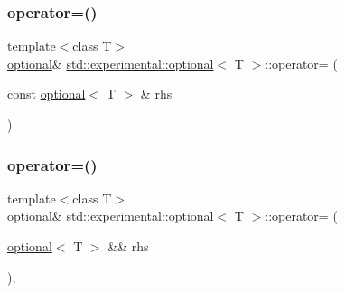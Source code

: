 \mbox{\label{classstd_1_1experimental_1_1optional_a79fc2baa94eb20e81898e351edbe984f}} 
\subsubsection{\texorpdfstring{operator=()}{operator=()}\hspace{0.1cm}{\footnotesize\ttfamily [2/4]}}
{\footnotesize\ttfamily template$<$class T$>$ \\
\hyperlink{classstd_1_1experimental_1_1optional}{optional}\& \hyperlink{classstd_1_1experimental_1_1optional}{std\+::experimental\+::optional}$<$ T $>$\+::operator= (\begin{DoxyParamCaption}\item[{const \hyperlink{classstd_1_1experimental_1_1optional}{optional}$<$ T $>$ \&}]{rhs }\end{DoxyParamCaption})\hspace{0.3cm}{\ttfamily [inline]}}

\mbox{\label{classstd_1_1experimental_1_1optional_a458e0eb811fd30159370230cb977ab7a}} 
\subsubsection{\texorpdfstring{operator=()}{operator=()}\hspace{0.1cm}{\footnotesize\ttfamily [3/4]}}
{\footnotesize\ttfamily template$<$class T$>$ \\
\hyperlink{classstd_1_1experimental_1_1optional}{optional}\& \hyperlink{classstd_1_1experimental_1_1optional}{std\+::experimental\+::optional}$<$ T $>$\+::operator= (\begin{DoxyParamCaption}\item[{\hyperlink{classstd_1_1experimental_1_1optional}{optional}$<$ T $>$ \&\&}]{rhs }\end{DoxyParamCaption})\hspace{0.3cm}{\ttfamily [inline]}, {\ttfamily [noexcept]}}

